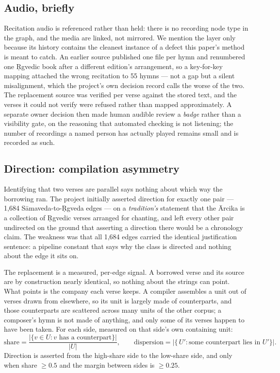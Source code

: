 \subsection{Audio, briefly}
\label{sec:audio}

Recitation audio is referenced rather than held: there is no recording node type in
the graph, and the media are linked, not mirrored. We mention the layer only because
its history contains the cleanest instance of a defect this paper's method is meant
to catch. An earlier source published one file per hymn and renumbered one
\d{R}gvedic book after a different edition's arrangement, so a key-for-key mapping
attached the wrong recitation to 55 hymns --- not a gap but a silent misalignment,
which the project's own decision record calls the worse of the two. The replacement
source was verified per verse against the stored text, and the verses it could not
verify were refused rather than mapped approximately. A separate owner decision then
made human audible review a \emph{badge} rather than a visibility gate, on the
reasoning that automated checking is not listening; the number of recordings a named
person has actually played remains small and is recorded as such.

\subsection{Direction: compilation asymmetry}
\label{sec:reuse}

Identifying that two verses are parallel says nothing about which way the borrowing
ran. The project initially asserted direction for exactly one pair --- 1{,}684
S\=amaveda-to-\d{R}gveda edges --- on a \emph{tradition's} statement that the
\=Arcika is a collection of \d{R}gvedic verses arranged for chanting, and left every
other pair undirected on the ground that asserting a direction there would be a
chronology claim. The weakness was that all 1{,}684 edges carried the identical
justification sentence: a pipeline constant that says why the class is directed and
nothing about the edge it sits on.

The replacement is a measured, per-edge signal. A borrowed verse and its source are
by construction nearly identical, so nothing about the strings can point. What points
is the company each verse keeps. A compiler assembles a unit out of verses drawn from
elsewhere, so its unit is largely made of counterparts, and those counterparts are
scattered across many units of the other corpus; a composer's hymn is not made of
anything, and only some of its verses happen to have been taken. For each side,
measured on that side's own containing unit:
\[
  \text{share} = \frac{|\{v \in U : v \text{ has a counterpart}\}|}{|U|},
  \qquad
  \text{dispersion} = |\{\,U' : \text{some counterpart lies in } U'\}|.
\]
Direction is asserted from the high-share side to the low-share side, and only when
share $\ge 0.5$ and the margin between sides is $\ge 0.25$.

